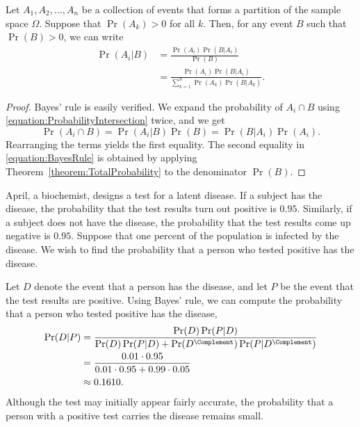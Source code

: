 \begin{theorem} 
Let $A_1, A_2, \ldots, A_n$ be a collection of events that forms a partition of the sample space $\Omega$.
Suppose that $\Pr (A_k) > 0$ for all $k$.
Then, for any event $B$ such that $\Pr (B) > 0$, we can write
\begin{equation} \label{equation:BayesRule}
\begin{split}
\Pr (A_i | B)
&= \frac{ \Pr (A_i) \Pr (B | A_i) }{ \Pr (B) } \\
&= \frac{ \Pr (A_i) \Pr (B | A_i) }
{ \sum_{k=1}^n \Pr (A_k) \Pr (B | A_k) } .
\end{split}
\end{equation}
\end{theorem}
\begin{proof}
Bayes' rule is easily verified.
We expand the probability of $A_i \cap B$ using \eqref{equation:ProbabilityIntersection} twice, and we get
\begin{equation*}
\Pr (A_i \cap B) = \Pr (A_i | B) \Pr (B) = \Pr (B | A_i) \Pr (A_i).
\end{equation*}
Rearranging the terms yields the first equality.
The second equality in \eqref{equation:BayesRule} is obtained by applying Theorem~\ref{theorem:TotalProbability} to the denominator $\Pr(B)$.
\end{proof}

\begin{example}
April, a biochemist, designs a test for a latent disease.
If a subject has the disease, the probability that the test results turn out positive is $0.95$.
Similarly, if a subject does not have the disease, the probability that the test results come up negative is $0.95$.
Suppose that one percent of the population is infected by the disease.
We wish to find the probability that a person who tested positive has the disease.

Let $D$ denote the event that a person has the disease, and let $P$ be the event that the test results are positive.
Using Bayes' rule, we can compute the probability that a person who tested positive has the disease,
\begin{equation*}
\begin{split}
\Pr (D|P)
&= \frac{ \Pr(D) \Pr(P|D) }{ \Pr(D) \Pr(P|D) + \Pr(D^{\Complement}) \Pr(P|D^{\Complement}) } \\
&= \frac{ 0.01 \cdot 0.95 }{ 0.01 \cdot 0.95 + 0.99 \cdot 0.05 } \\
&\approx 0.1610 .
\end{split}
\end{equation*}
Although the test may initially appear fairly accurate, the probability that a person with a positive test carries the disease remains small.
\end{example}


